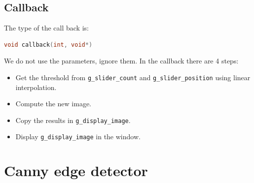 \documentclass[english,a4paper,12pt,oneside]{article}
\begin{document}
 \subsection{Callback}
 
The type of the call back is:
\begin{lstlisting}[language=c++]
void callback(int, void*)
\end{lstlisting}
We do not use the parameters, ignore them.
In the callback there are 4 steps:
\begin{itemize}
 \item Get the threshold from \verb+g_slider_count+ and \verb+g_slider_position+ using linear interpolation.
 \item Compute the new image.
 \item Copy the results in \verb+g_display_image+.
 \item Display \verb+g_display_image+ in the window.
\end{itemize}


\section{Canny edge detector}
\end{document}
